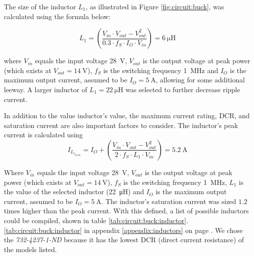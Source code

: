 The size of the inductor $L_1$, as illustrated in Figure \ref{fig:circuit:buck},
was calculated using the formula below:

\begin{equation}
    L_1 = \left( \frac{V_{in} \cdot V_{out} - V_{out}^2}{0.3 \cdot f_S \cdot I_O \cdot V_{in}} \right) = \SI{6}{\micro\henry}
    \label{eq:circuit:buck:inductor}
\end{equation}

where  $V_{in}$ equals  the  input voltage  \SI{28}{\volt},  $V_{out}$ is  the
output voltage  at peak  power (which exists  at $V_{out}  = \SI{14}{\volt}$),
$f_S$ is the switching frequency  \SI{1}{\mega\hertz} and $I_O$ is the maximum
output  current, assumed  to be  $I_O  = \SI{5}{\ampere}$,  allowing for  some
additional leeway.   A larger  inductor of  $L_1 =  \SI{22}{\micro\henry}$ was
selected to further decrease ripple current.

In addition to the value inductor's value, the maximum current rating, DCR, and
saturation  current are also important factors to consider. The inductor's peak
current is calculated using
\begin{equation}
    I_{L_{1_{peak}}} = I_O + \left( \frac{V_{in} \cdot V_{out} - V_{out}^2}{2 \cdot f_S \cdot L_1 \cdot V_{in}} \right) = \SI{5.2}{\ampere}
    \label{eq:circuit:buck:inductor_peak}
\end{equation}

Where  $V_{in}$ equals  the  input voltage  \SI{28}{\volt},  $V_{out}$ is  the
output voltage  at peak  power (which exists  at $V_{out}  = \SI{14}{\volt}$),
$f_S$ is  the switching frequency  \SI{1}{\mega\hertz}, $L_1$ is the  value of
the selected inductor (\SI{22}{\micro\henry}) and  $I_O$ is the maximum output
current, assumed  to be  $I_O =  \SI{5}{\ampere}$.  The  inductor's saturation
current  was  sized  $1.2$  times  higher than  the  peak  current. With  this
defined,  a list  of  possible inductors  could be  compiled,  shown in  table
\ref{tab:circuit:buck:inductor}.  \ref{tab:circuit:buck:inductor} in  appendix
\ref{appendix:inductors} on  page \pageref{appendix:inductors}.  We  chose the
\emph{732-4237-1-ND} because it has the lowest DCR (direct current resistance)
of the models listed.
